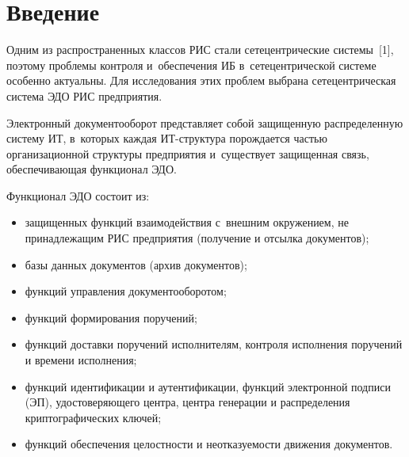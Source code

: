   
  



\thispagestyle{headings}

\begin{multicols}{2}

\label{st\stat}
  
  \section{Введение }
  
  Одним из распространенных классов РИС стали сетецентрические системы~[1], поэтому проб\-ле\-мы контроля 
и~обеспечения ИБ в~сетецентрической сис\-те\-ме 
особенно актуальны. Для исследования этих проблем выбрана сетецентрическая 
сис\-те\-ма ЭДО РИС предприятия. 

Электронный документооборот 
представляет собой защищенную распределенную сис\-те\-му ИТ, в~которых каждая ИТ-струк\-ту\-ра порождается \mbox{частью} 
организационной структуры предприятия и~существует защищенная связь, 
обеспечивающая функционал ЭДО. 
  
  Функционал ЭДО состоит из:
  \begin{itemize}
\item защищенных функций взаимодействия с~внешним окружением, не 
принадлежащим РИС предприятия (получение и отсылка документов);
\item базы данных документов (архив документов);
\item функций управления документооборотом;
\item функций формирования поручений;
\item функций доставки поручений исполнителям, контроля исполнения 
поручений и времени исполнения;
\item функций идентификации и аутентификации, функций электронной 
подписи (ЭП), удосто\-ве\-ря\-юще\-го центра, центра генерации и распределения 
криптографических ключей;
\item функций обеспечения целостности и неотказуемости движения 
документов. 
\end{itemize}


\end{multicols}

